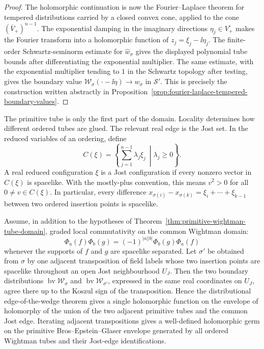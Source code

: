 \begin{proof}
The holomorphic continuation is now the Fourier--Laplace theorem for
tempered distributions carried by a closed convex cone, applied to the cone
\((\overline V_+)^{n-1}\).  The exponential damping in the imaginary
directions \(\eta_j\in V_+^\circ\) makes the Fourier transform into a
holomorphic function of \(z_j=\xi_j-\ii\eta_j\).  The finite-order
Schwartz-seminorm estimate for \(\widehat w_\sigma\) gives the displayed
polynomial tube bounds after differentiating the exponential multiplier.  The
same estimate, with the exponential multiplier tending to \(1\) in the
Schwartz topology after testing, gives the boundary value
\(\mathcal W_\sigma(\cdot-\ii\eta)\to w_\sigma\) in \(\mathcal S'\).  This
is precisely the construction written abstractly in
Proposition~\ref{prop:fourier-laplace-tempered-boundary-values}.
\end{proof}

The primitive tube is only the first part of the domain.  Locality determines
how different ordered tubes are glued.  The relevant real edge is the Jost
set.  In the reduced variables of an ordering, define
\[
  C(\xi)
  =
  \left\{
    \sum_{j=1}^{n-1}\lambda_j\xi_j\ \middle|
    \lambda_j\ge0
  \right\}.
\]
A real reduced configuration \(\xi\) is a Jost configuration if every
nonzero vector in \(C(\xi)\) is spacelike.  With the mostly-plus convention,
this means \(v^2>0\) for all \(0\ne v\in C(\xi)\).  In particular, every
difference \(x_{\sigma(i)}-x_{\sigma(k)}=\xi_i+\cdots+\xi_{k-1}\) between
two ordered insertion points is spacelike.

\begin{theorem}
\label{thm:jost-edge-gluing-primitive-tubes}
Assume, in addition to the hypotheses of
Theorem~\ref{thm:primitive-wightman-tube-domain}, graded local commutativity
on the common Wightman domain:
\[
  \Phi_a(f)\Phi_b(g)
  =
  (-1)^{|a||b|}\Phi_b(g)\Phi_a(f)
\]
whenever the supports of \(f\) and \(g\) are spacelike separated.  Let
\(\sigma'\) be obtained from \(\sigma\) by one adjacent transposition of
field labels whose two insertion points are spacelike throughout an open Jost
neighbourhood \(U_J\).  Then the two boundary distributions
\(\operatorname{bv}\mathcal W_\sigma\) and
\(\operatorname{bv}\mathcal W_{\sigma'}\), expressed in the same real
coordinates on \(U_J\), agree there up to the Koszul sign of the
transposition.  Hence the distributional edge-of-the-wedge theorem gives a
single holomorphic function on the envelope of holomorphy of the union of the
two adjacent primitive tubes and the common Jost edge.  Iterating adjacent
transpositions gives a well-defined holomorphic germ on the primitive
Bros--Epstein--Glaser envelope generated by all ordered Wightman tubes and
their Jost-edge identifications.
\end{theorem}

